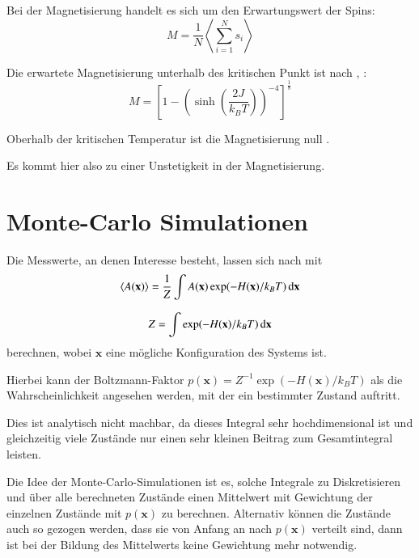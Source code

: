 \documentclass{scrreprt}
\begin{document}
	
	Bei der Magnetisierung handelt es sich um den Erwartungswert der Spins\cite[vgl. ][S. 8]{binderheermann}:\[
	M=\frac{1}{N}\left\langle  \sum_{i=1}^{N} s_i \right\rangle 
	\]
	
	Die erwartete Magnetisierung unterhalb des kritischen Punkt ist nach \cite{YangMagnetization}, \cite{MontrollMagnetization}:
	\begin{equation} M=\left[1-\left(\sinh\left(\frac{2J}{k_BT}\right)\right)^{-4}\right]^{\frac{1}{8}}
	\label{eq:magnetisierungsgleichungliteratur}
	\end{equation}
	
	Oberhalb der kritischen Temperatur ist die Magnetisierung null \cite[Gl. 81]{MontrollMagnetization}.
	
	Es kommt hier also zu einer Unstetigkeit in der Magnetisierung.
	
	\section{Monte-Carlo Simulationen}
	Die Messwerte, an denen Interesse besteht, lassen sich nach \cite[S. 8]{binderheermann}  mit \[
	\langle A(\mathbf{x}) \rangle=\frac{1}{Z}\int A(\mathbf{x}) \exp(-H(\mathbf{x})/k_BT)\dif \mathbf{x}\]
	
	\[
	Z=\int \exp(-H(\mathbf{x})/k_BT) \dif \mathbf{x}
	\]
	berechnen, wobei $\mathbf{x}$ eine mögliche Konfiguration des Systems ist.
	
	
	Hierbei kann der Boltzmann-Faktor $p(\mathbf{x})=Z^{-1} \exp(-H(\mathbf{x})/k_BT)$ als die Wahrscheinlichkeit angesehen werden, mit der ein bestimmter Zustand auftritt\cite[vgl. ][S. 8 f.]{binderheermann}.
	
	Dies ist analytisch nicht machbar, da dieses Integral sehr hochdimensional ist und gleichzeitig viele Zustände nur einen sehr kleinen Beitrag zum Gesamtintegral leisten\cite[vgl. ][S. 9]{binderheermann}.
	
	Die Idee der Monte-Carlo-Simulationen ist es, solche Integrale zu Diskretisieren
	und über alle berechneten Zustände einen Mittelwert mit Gewichtung der einzelnen Zustände mit $p(\mathbf{x})$ zu berechnen. Alternativ können die Zustände auch so gezogen werden, dass sie von Anfang an nach $p(\mathbf{x})$ verteilt sind, dann ist bei der Bildung des Mittelwerts keine Gewichtung mehr notwendig. %
	
\end{document}
